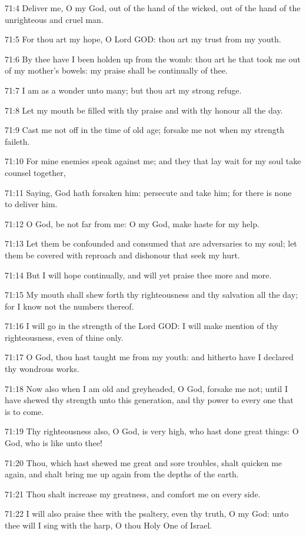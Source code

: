 71:4 Deliver me, O my God, out of the hand of the wicked, out of the hand of the unrighteous and cruel man.

71:5 For thou art my hope, O Lord GOD: thou art my trust from my youth.

71:6 By thee have I been holden up from the womb: thou art he that took me out of my mother's bowels: my praise shall be continually of thee.

71:7 I am as a wonder unto many; but thou art my strong refuge.

71:8 Let my mouth be filled with thy praise and with thy honour all the day.

71:9 Cast me not off in the time of old age; forsake me not when my strength faileth.

71:10 For mine enemies speak against me; and they that lay wait for my soul take counsel together,

71:11 Saying, God hath forsaken him: persecute and take him; for there is none to deliver him.

71:12 O God, be not far from me: O my God, make haste for my help.

71:13 Let them be confounded and consumed that are adversaries to my soul; let them be covered with reproach and dishonour that seek my hurt.

71:14 But I will hope continually, and will yet praise thee more and more.

71:15 My mouth shall shew forth thy righteousness and thy salvation all the day; for I know not the numbers thereof.

71:16 I will go in the strength of the Lord GOD: I will make mention of thy righteousness, even of thine only.

71:17 O God, thou hast taught me from my youth: and hitherto have I declared thy wondrous works.

71:18 Now also when I am old and greyheaded, O God, forsake me not; until I have shewed thy strength unto this generation, and thy power to every one that is to come.

71:19 Thy righteousness also, O God, is very high, who hast done great things: O God, who is like unto thee!

71:20 Thou, which hast shewed me great and sore troubles, shalt quicken me again, and shalt bring me up again from the depths of the earth.

71:21 Thou shalt increase my greatness, and comfort me on every side.

71:22 I will also praise thee with the psaltery, even thy truth, O my God: unto thee will I sing with the harp, O thou Holy One of Israel.

